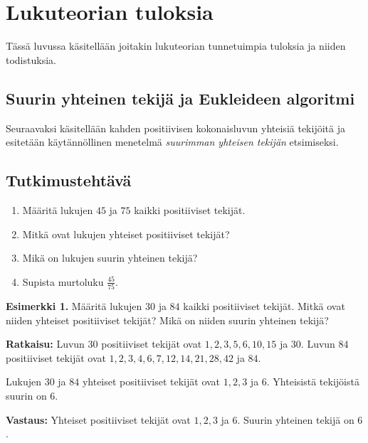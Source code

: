 \newpage

\chapter{Lukuteorian tuloksia}

Tässä luvussa käsitellään joitakin lukuteorian tunnetuimpia tuloksia ja niiden todistuksia.

\section{Suurin yhteinen tekijä ja Eukleideen algoritmi}
Seuraavaksi käsitellään kahden positiivisen kokonaisluvun yhteisiä tekijöitä ja esitetään käytännöllinen menetelmä {\em suurimman yhteisen tekijän} etsimiseksi.

\section*{Tutkimustehtävä}
\begin{enumerate}
\item Määritä lukujen $45$ ja $75$ kaikki positiiviset tekijät.
\item Mitkä ovat lukujen yhteiset positiiviset tekijät?
\item Mikä on lukujen suurin yhteinen tekijä?
\item Supista murtoluku $\frac{45}{75}$.
\end{enumerate}


{\bf Esimerkki 1.} Määritä lukujen $30$ ja $84$ kaikki positiiviset tekijät. Mitkä ovat niiden yhteiset positiiviset tekijät? Mikä on niiden suurin yhteinen tekijä?

{\bf Ratkaisu:} Luvun $30$ positiiviset tekijät ovat $1, 2, 3, 5, 6, 10, 15$ ja $30$. Luvun $84$ positiiviset tekijät ovat $1, 2, 3, 4, 6, 7, 12, 14, 21, 28, 42$ ja $84$.

Lukujen $30$ ja $84$ yhteiset positiiviset tekijät ovat $1, 2, 3$ ja $6$. Yhteisistä tekijöistä suurin on $6$.

{\bf Vastaus:} 
Yhteiset positiiviset tekijät ovat $1, 2, 3$ ja $6$. Suurin yhteinen tekijä on $6$.



